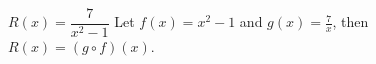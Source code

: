 {$R(x) = \dfrac{7}{x^2-1}$}
{ Let $f(x) = x^2-1$ and $g(x) = \frac{7}{x}$, then $R(x) =(g\circ f)(x)$.}